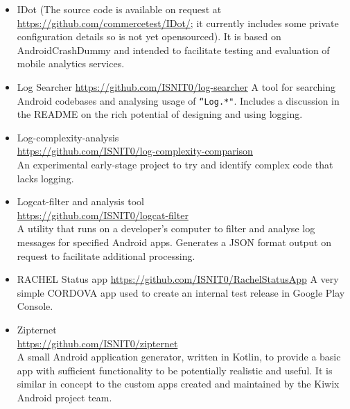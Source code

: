 \begin{itemize}
    \item IDot (The source code is available on request at \url{https://github.com/commercetest/IDot/}; it currently includes some private configuration details so is not yet opensourced). It is based on AndroidCrashDummy and intended to facilitate testing and evaluation of mobile analytics services. 
    
    \item Log Searcher \url{https://github.com/ISNIT0/log-searcher} A tool for searching Android codebases and analysing usage of \texttt{``Log.*"}. Includes a discussion in the README on the rich potential of designing and using logging.
    
    \item Log-complexity-analysis\\ \url{https://github.com/ISNIT0/log-complexity-comparison}\\ An experimental early-stage project to try and identify complex code that lacks logging.
    
    \item Logcat-filter and analysis tool\\ \url{https://github.com/ISNIT0/logcat-filter}\\ A utility that runs on a developer's computer to filter and analyse log messages for specified Android apps. Generates a JSON format output on request to facilitate additional processing.
    
    \item RACHEL Status app \url{https://github.com/ISNIT0/RachelStatusApp} A very simple CORDOVA app used to create an internal test release in Google Play Console. 
    
    
    \item Zipternet\\ \url{https://github.com/ISNIT0/zipternet}\\ A small Android application generator, written in Kotlin, to provide a basic app with sufficient functionality to be potentially realistic and useful. It is similar in concept to the custom apps created and maintained by the Kiwix Android project team.
\end{itemize}

\begin{comment}
RACHEL Status app uses Cordova. Needed updating. Also needs to use JAVA8 compiler, see \url{https://kodejava.org/how-do-i-set-the-default-java-jdk-version-on-mac-os-x/} to set this for the CLI.
\end{comment}

